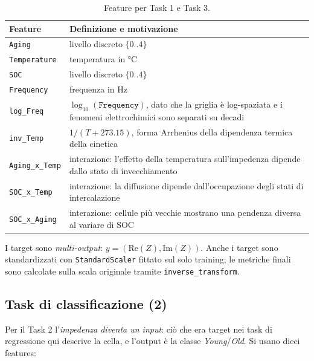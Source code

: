 \begin{table}[H]
  \centering
  \caption{Feature per Task 1 e Task 3.}
  \label{tab:regression-features}
  \begin{tabularx}{\linewidth}{lX}
    \toprule
    \textbf{Feature} & \textbf{Definizione e motivazione} \\
    \midrule
    \texttt{Aging} & livello discreto $\{0..4\}$ \\
    \texttt{Temperature} & temperatura in \si{\celsius} \\
    \texttt{SOC} & livello discreto $\{0..4\}$ \\
    \texttt{Frequency} & frequenza in \si{\hertz} \\
    \texttt{log\_Freq} & $\log_{10}(\texttt{Frequency})$, dato che la
                        griglia è log-spaziata e i fenomeni elettrochimici
                        sono separati su decadi \\
    \texttt{inv\_Temp} & $1/(T + 273.15)$, forma Arrhenius della
                        dipendenza termica della cinetica \\
    \texttt{Aging\_x\_Temp} & interazione: l'effetto della temperatura
                              sull'impedenza dipende dallo stato di
                              invecchiamento \\
    \texttt{SOC\_x\_Temp}   & interazione: la diffusione dipende
                              dall'occupazione degli stati di intercalazione \\
    \texttt{SOC\_x\_Aging}  & interazione: cellule più vecchie mostrano una
                              pendenza diversa al variare di SOC \\
    \bottomrule
  \end{tabularx}
\end{table}

I target sono \emph{multi-output}: $y = (\mathrm{Re}(Z), \mathrm{Im}(Z))$.
Anche i target sono standardizzati con \texttt{StandardScaler} fittato sul
solo training; le metriche finali sono calcolate sulla scala originale
tramite \texttt{inverse\_transform}.

\newpage
\subsection{Task di classificazione (2)}

Per il Task 2 l'\emph{impedenza diventa un input}: ciò che era target nei
task di regressione qui descrive la cella, e l'output è la classe
\emph{Young}/\emph{Old}. Si usano dieci features:

